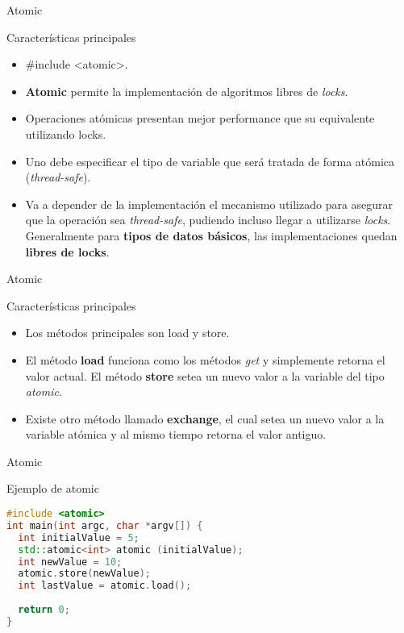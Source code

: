 \begin{frame}{Atomic}
\begin{block}{Características principales}
\begin{itemize}
  \item \#include \textless atomic\textgreater .
  \item \textbf{Atomic} permite la implementación de algoritmos libres de \textit{locks}.
  \item Operaciones atómicas presentan mejor performance que su equivalente utilizando locks.
  \item Uno debe especificar el tipo de variable que será tratada de forma atómica (\textit{thread-safe}).
  \item Va a depender de la implementación el mecanismo utilizado para asegurar que la operación sea \textit{thread-safe}, pudiendo incluso llegar a utilizarse \textit{locks}. Generalmente para \textbf{tipos de datos básicos}, las implementaciones quedan \textbf{libres de locks}.
\end{itemize}
\end{block}
\end{frame}

\begin{frame}{Atomic}
\begin{block}{Características principales}
\begin{itemize}
  \item Los métodos principales son load y store.
  \item El método \textbf{load} funciona como los métodos \textit{get} y simplemente retorna el valor actual. El método \textbf{store} setea un nuevo valor a la variable del tipo \textit{atomic}.
  \item Existe otro método llamado \textbf{exchange}, el cual setea un nuevo valor a la variable atómica y al mismo tiempo retorna el valor antiguo.
\end{itemize}
\end{block}
\end{frame}

\begin{frame}[fragile]{Atomic}
\begin{block}{Ejemplo de atomic}
\begin{lstlisting}[language=C++, basicstyle=\small]
#include <atomic>
int main(int argc, char *argv[]) {
  int initialValue = 5;
  std::atomic<int> atomic (initialValue);
  int newValue = 10;
  atomic.store(newValue);
  int lastValue = atomic.load();
  
  return 0;
}
\end{lstlisting}
\end{block}
\end{frame}

